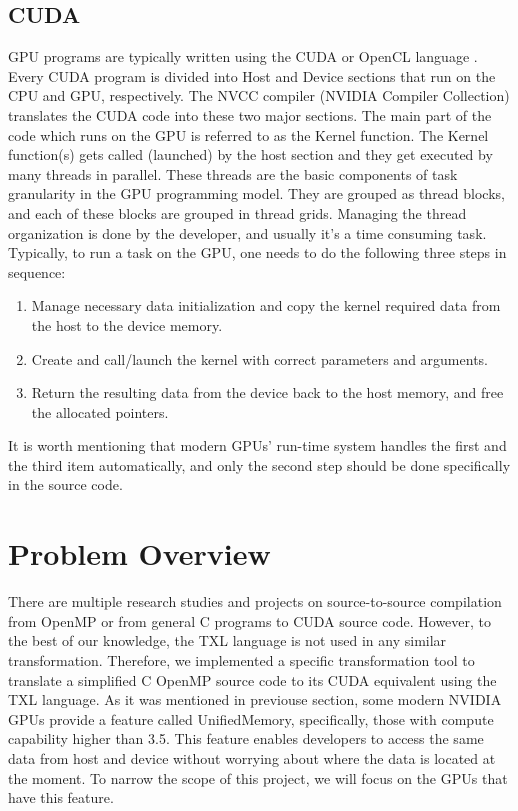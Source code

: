 \documentclass{article}
\begin{document}
\subsection{CUDA}

GPU programs are typically written using the CUDA or OpenCL language \citep{nvidia}. Every CUDA program is divided into Host and Device sections that run on the CPU and GPU, respectively. The NVCC compiler (NVIDIA Compiler Collection) translates the CUDA code into these two major sections. The main part of the code which runs on the GPU is referred to as the Kernel function. The Kernel function(s) gets called (launched) by the host section and they get executed by many threads in parallel. These threads are the basic components of task granularity in the GPU programming model. They are grouped as thread blocks, and each of these blocks are grouped in thread grids. Managing the thread organization is done by the developer, and usually it's a time consuming task. Typically, to run a task on the GPU, one needs to do the following three steps in sequence:
\begin{enumerate}
    \item Manage necessary data initialization and copy the kernel required data from the host to the device memory.
    \item Create and call/launch the kernel with correct parameters and arguments.
    \item Return the resulting data from the device back to the host memory, and free the allocated pointers.
\end{enumerate}
It is worth mentioning that modern GPUs' run-time system handles the first and the third item automatically, and only the second step should be done specifically in the source code. 

\section{Problem Overview}
There are multiple research studies and projects on source-to-source compilation from OpenMP or from general C programs to CUDA source code. However, to the best of our knowledge, the TXL language is not used in any similar transformation. Therefore, we implemented a specific transformation tool to translate a simplified C OpenMP source code to its CUDA equivalent using the TXL language. 
As it was mentioned in previouse section, some modern NVIDIA GPUs provide a feature called UnifiedMemory, specifically, those with compute capability higher than 3.5. This feature enables developers to access the same data from host and device without worrying about where the data is located at the moment. To narrow the scope of this project, we will focus on the GPUs that have this feature.
\end{document}
